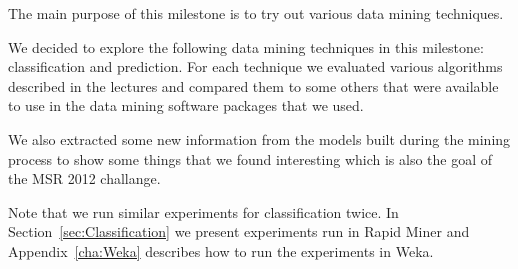The main purpose of this milestone is to try out various data mining techniques.

We decided to explore the following data mining techniques in this milestone: classification and prediction. For each technique we evaluated various algorithms described in the lectures and compared them to some others that were available to use in the data mining software packages that we used. 

We also extracted some new information from the models built during the mining process to show some things that we found interesting which is also the goal of the MSR 2012 challange.

Note that we run similar experiments for classification twice. In Section~\ref{sec:Classification} we present experiments run in Rapid Miner and Appendix~\ref{cha:Weka} describes how to run the experiments in Weka.

